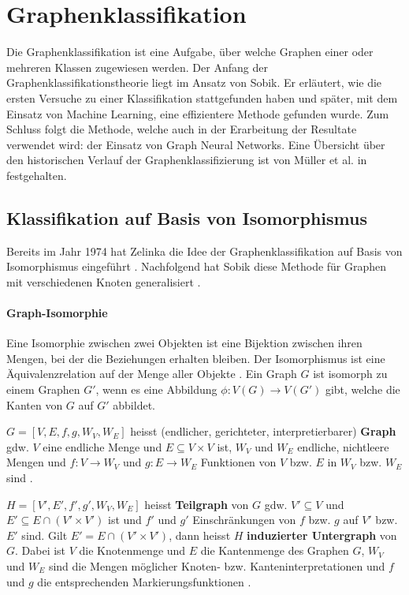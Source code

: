 \section{Graphenklassifikation} \label{sec:classification_theory}

Die Graphenklassifikation ist eine Aufgabe, über welche Graphen einer oder mehreren Klassen zugewiesen werden.
Der Anfang der Graphenklassifikationstheorie liegt im Ansatz von Sobik. Er erläutert, wie die ersten Versuche zu einer Klassifikation stattgefunden haben und später, mit dem Einsatz von Machine Learning, eine effizientere Methode gefunden wurde.
Zum Schluss folgt die Methode, welche auch in der Erarbeitung der Resultate verwendet wird: der Einsatz von Graph Neural Networks.
Eine Übersicht über den historischen Verlauf der Graphenklassifizierung ist von Müller et al. in \cite{prokop_comparing_2013} festgehalten.

\subsection{Klassifikation auf Basis von Isomorphismus} \label{isomorphismus}

Bereits im Jahr 1974 hat Zelinka die Idee der Graphenklassifikation auf Basis von Isomorphismus eingeführt \cite{zelinka_certain_1975}.
Nachfolgend hat Sobik diese Methode für Graphen mit verschiedenen Knoten generalisiert \cite{sobik1}.

\paragraph{Graph-Isomorphie}
Eine Isomorphie zwischen zwei Objekten ist eine Bijektion zwischen ihren Mengen, bei der die Beziehungen erhalten bleiben. Der Isomorphismus ist eine Äquivalenzrelation auf der Menge aller Objekte \cite{mckay_practical_2014}.
Ein Graph $G$ ist isomorph zu einem Graphen $G'$, wenn es eine Abbildung $\phi: V(G) \rightarrow V(G')$ gibt, welche die Kanten von $G$ auf $G'$ abbildet.

$ G = [V, E, f, g, W_V, W_E] $ heisst (endlicher, gerichteter, interpretierbarer) \textbf{Graph} gdw. $V$ eine endliche Menge und $ E \subseteq V \times V $ ist, $ W_V $ und $ W_E $ endliche, nichtleere Mengen und $ f: V \rightarrow W_V $ und $ g: E \rightarrow W_E $ Funktionen von $V$ bzw. $E$ in $W_V$ bzw. $W_E$ sind \cite[p.~65]{sobik1}.

$ H = [V', E', f', g', W_V, W_E] $ heisst \textbf{Teilgraph} von $G$ gdw. $V' \subseteq V$ und $E' \subseteq E \cap (V' \times V') $ ist und $f'$ und $g'$ Einschränkungen von $f$ bzw. $g$ auf $V'$ bzw. $E'$ sind. Gilt $E' = E \cap (V' \times V')$, dann heisst $H$ \textbf{induzierter Untergraph} von $G$.
Dabei ist $V$ die Knotenmenge und $E$ die Kantenmenge des Graphen $G$, $W_V$ und $W_E$ sind die Mengen möglicher Knoten- bzw. Kanteninterpretationen und $f$ und $g$ die entsprechenden Markierungsfunktionen \cite[p.~65]{sobik1}.

